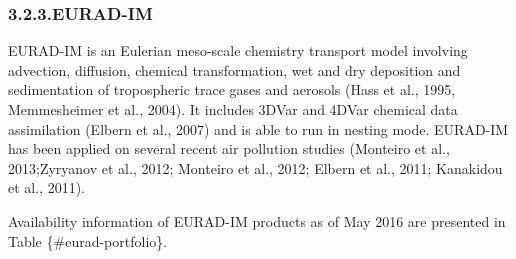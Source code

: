\documentclass[9pt]{report}
\begin{document}
\subsubsection{3.2.3.\hspace*{0.5em}EURAD-IM}\label{sec-eurad-im}%

\noindent{}EURAD-IM is an Eulerian meso-scale chemistry transport model involving advection, diffusion, chemical transformation, wet and dry deposition and sedimentation of tropospheric trace gases and aerosols (Hass et al., 1995, Memmesheimer et al., 2004). It includes 3DVar and 4DVar chemical data assimilation (Elbern et al., 2007) and is able to run in nesting mode.
EURAD-IM has been applied on several recent air pollution studies (Monteiro et al., 2013;Zyryanov et al., 2012; Monteiro et al., 2012; Elbern et al., 2011; Kanakidou et al., 2011).%

Availability information of EURAD-IM products as of May 2016 are presented in Table \{\#eurad-portfolio\}.%
\end{document}

